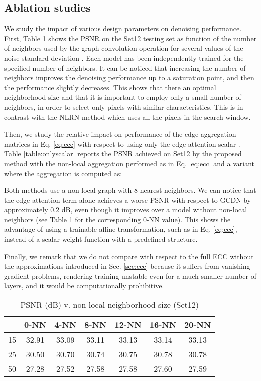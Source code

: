 \documentclass[journal]{IEEEtran}
\begin{document}
\subsection{Ablation studies}
We study the impact of various design parameters on denoising performance. First, Table \ref{table:psnr_vs_nn} shows the PSNR on the Set12 testing set as function of the number of neighbors used by the graph convolution operation for several values of the noise standard deviation . Each model has been independently trained for the specified number of neighbors.  It can be noticed that increasing the number of neighbors improves the denoising performance up to a saturation point, and then the performance slightly decreases. This shows that there an optimal neighborhood size and that it is important to employ only a small number of neighbors, in order to select only pixels with similar characteristics. This is in contrast with the NLRN method which uses all the pixels in the search window.

Then, we study the relative impact on performance of the edge aggregation matrices  in Eq. \eqref{eq:ecc} with respect to using only the edge attention scalar . Table \ref{table:onlyscalar} reports the PSNR achieved on Set12 by the proposed method with the non-local aggregation performed as in Eq. \eqref{eq:ecc} and a variant where the aggregation is computed as:

Both methods use a non-local graph with 8 nearest neighbors.
We can notice that the edge attention term alone achieves a worse PSNR with respect to GCDN by approximately 0.2 dB, even though it improves over a model without non-local neighbors (see Table \ref{table:psnr_vs_nn} for the corresponding 0-NN value). This shows the advantage of using a trainable affine transformation, such as  in Eq. \eqref{eq:ecc}, instead of a scalar weight function with a predefined structure. 

Finally, we remark that we do not compare with respect to the full ECC without the approximations introduced in Sec. \ref{sec:ecc} because it suffers from vanishing gradient problems, rendering training unstable even for a much smaller number of layers, and it would be computationally prohibitive.

\begin{table} 
\centering
\caption{PSNR (dB) v. non-local neighborhood size (Set12)}
\begin{tabular}{ccccccc}
\hline
 & 0-NN & 4-NN & 8-NN & 12-NN & 16-NN & 20-NN \\ \hline
15       & 32.91 & 33.09 & 33.11 & 33.13 & 33.14 & 33.13 \\ \hline
25       & 30.50 & 30.70 & 30.74 & 30.75 & 30.78 & 30.78 \\ \hline
50       & 27.28 & 27.52 & 27.58 & 27.58 & 27.60 & 27.59 \\ \hline
\end{tabular}
\label{table:psnr_vs_nn}
\end{table}
\end{document}
